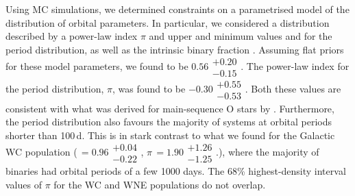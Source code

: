 Using MC simulations, we determined constraints on a parametrised model of the distribution of orbital parameters. In particular, we considered a distribution described by a power-law index $\pi$ and upper and minimum values \logPmin{} and \logPmax{} for the period distribution, as well as the intrinsic binary fraction \fintWNE{}. Assuming flat priors for these model parameters, we found \fintWNE{} to be $0.56\substack{+0.20 \\ -0.15}$. The power-law index for the period distribution, $\pi$, was found to be $-0.30\substack{+0.55 \\ -0.53}$. Both these values are consistent with what was derived for main-sequence O stars by \citet{2012Sana}. Furthermore, the period distribution also favours the majority of systems at orbital periods shorter than 100\,d. This is in stark contrast to what we found for the Galactic WC population (\fintWC{}\,$= 0.96\substack{+0.04 \\ -0.22}$, $\pi$\,$= 1.90\substack{+1.26 \\ -1.25}$.), where the majority of binaries had orbital periods of a few 1000 days. The 68\% highest-density interval values of $\pi$ for the WC and WNE populations do not overlap.



